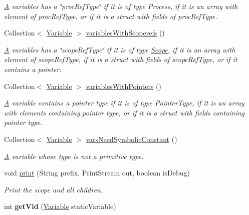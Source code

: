 \begin{DoxyCompactItemize}
\begin{DoxyCompactList}\small\item\em \hyperlink{structA}{A} variables has a \char`\"{}proc\+Ref\+Type\char`\"{} if it is of type Process, if it is an array with element of proc\+Ref\+Type, or if it is a struct with fields of proc\+Ref\+Type. \end{DoxyCompactList}\item 
Collection$<$ \hyperlink{interfaceedu_1_1udel_1_1cis_1_1vsl_1_1civl_1_1model_1_1IF_1_1variable_1_1Variable}{Variable} $>$ \hyperlink{interfaceedu_1_1udel_1_1cis_1_1vsl_1_1civl_1_1model_1_1IF_1_1Scope_ac16c2876eaad3eeaa23729b7b3b0d38f}{variables\+With\+Scoperefs} ()
\begin{DoxyCompactList}\small\item\em \hyperlink{structA}{A} variables has a \char`\"{}scope\+Ref\+Type\char`\"{} if it is of type \hyperlink{interfaceedu_1_1udel_1_1cis_1_1vsl_1_1civl_1_1model_1_1IF_1_1Scope}{Scope}, if it is an array with element of scope\+Ref\+Type, if it is a struct with fields of scope\+Ref\+Type, or if it contains a pointer. \end{DoxyCompactList}\item 
Collection$<$ \hyperlink{interfaceedu_1_1udel_1_1cis_1_1vsl_1_1civl_1_1model_1_1IF_1_1variable_1_1Variable}{Variable} $>$ \hyperlink{interfaceedu_1_1udel_1_1cis_1_1vsl_1_1civl_1_1model_1_1IF_1_1Scope_aab7b1c856dde89b9ef617225b5529301}{variables\+With\+Pointers} ()
\begin{DoxyCompactList}\small\item\em \hyperlink{structA}{A} variable contains a pointer type if it is of type Pointer\+Type, if it is an array with elements containing pointer type, or if it is a struct with fields containing pointer type. \end{DoxyCompactList}\item 
Collection$<$ \hyperlink{interfaceedu_1_1udel_1_1cis_1_1vsl_1_1civl_1_1model_1_1IF_1_1variable_1_1Variable}{Variable} $>$ \hyperlink{interfaceedu_1_1udel_1_1cis_1_1vsl_1_1civl_1_1model_1_1IF_1_1Scope_a9c90020dd91dc2ec4fc3881b424b44c9}{vars\+Need\+Symbolic\+Constant} ()
\begin{DoxyCompactList}\small\item\em \hyperlink{structA}{A} variable whose type is not a primitive type. \end{DoxyCompactList}\item 
void \hyperlink{interfaceedu_1_1udel_1_1cis_1_1vsl_1_1civl_1_1model_1_1IF_1_1Scope_a5028a5e6bd1cc95543b2799cb81b6546}{print} (String prefix, Print\+Stream out, boolean is\+Debug)
\begin{DoxyCompactList}\small\item\em Print the scope and all children. \end{DoxyCompactList}\item 
\hypertarget{interfaceedu_1_1udel_1_1cis_1_1vsl_1_1civl_1_1model_1_1IF_1_1Scope_a5641fe581e206fe3ad142a5ce1928be7}{}int {\bfseries get\+Vid} (\hyperlink{interfaceedu_1_1udel_1_1cis_1_1vsl_1_1civl_1_1model_1_1IF_1_1variable_1_1Variable}{Variable} static\+Variable)\label{interfaceedu_1_1udel_1_1cis_1_1vsl_1_1civl_1_1model_1_1IF_1_1Scope_a5641fe581e206fe3ad142a5ce1928be7}


\end{DoxyCompactItemize}
